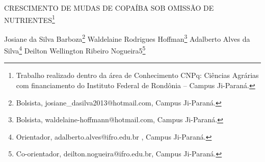 \documentclass[article,12pt,onesidea,4paper,english,brazil]{abntex2}
\begin{document}
	
	
	\frenchspacing 
	
	\begin{center}
		\LARGE CRESCIMENTO DE MUDAS DE COPAÍBA SOB OMISSÃO DE NUTRIENTES\footnote{Trabalho realizado dentro da área de Conhecimento CNPq: Ciências Agrárias com financiamento do
			Instituto Federal de Rondônia – Campus Ji-Paraná.}
		
		\normalsize
	Josiane da Silva Barboza\footnote{Bolsista, josiane\_dasilva2013@hotmail.com, Campus Ji-Paraná.} 
		Waldelaine Rodrigues Hoffman\footnote{Bolsista, waldelaine-hoffmann@hotmail.com, Campus Ji-Paraná.} 
		Adalberto Alves da Silva\footnote{Orientador, adalberto.alves@ifro.edu.br , Campus Ji-Paraná.} 
		Deilton
		Wellington Ribeiro Nogueira5\footnote{Co-orientador, deilton.nogueira@ifro.edu.br, Campus Ji-Paraná.} 
	\end{center}
	
\end{document}
